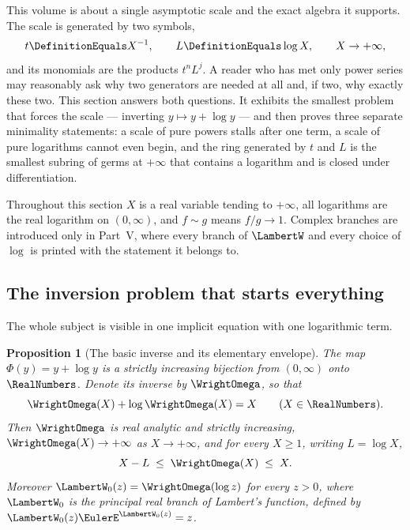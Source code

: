 \documentclass[11pt,oneside]{article}
\theoremstyle{plain}
\newtheorem{proposition}[theorem]{Proposition}
\theoremstyle{definition}
\theoremstyle{remark}
\begin{document}
This volume is about a single asymptotic scale and the exact algebra it
supports.  The scale is generated by two symbols,
\begin{equation}\label{plt:eq:mot-generators}
  t\DefinitionEquals X^{-1},
  \qquad
  L\DefinitionEquals\log X,
  \qquad X\to+\infty,
\end{equation}
and its monomials are the products \(t^{n}L^{j}\).  A reader who has met only
power series may reasonably ask why two generators are needed at all and, if
two, why exactly these two.  This section answers both questions.  It exhibits
the smallest problem that forces the scale --- inverting \(y\mapsto y+\log y\)
--- and then proves three separate minimality statements: a scale of pure
powers stalls after one term, a scale of pure logarithms cannot even begin, and
the ring generated by \(t\) and \(L\) is the smallest subring of germs at
\(+\infty\) that contains a logarithm and is closed under differentiation.

Throughout this section \(X\) is a real variable tending to \(+\infty\), all
logarithms are the real logarithm on \((0,\infty)\), and \(f\sim g\) means
\(f/g\to1\).  Complex branches are introduced only in Part~V, where every
branch of \(\LambertW\) and every choice of \(\log\) is printed with the
statement it belongs to.

\subsection{The inversion problem that starts everything}
\label{plt:sec:mot-inversion}

The whole subject is visible in one implicit equation with one logarithmic
term.

\begin{proposition}[The basic inverse and its elementary envelope]
\label{plt:prop:mot-omega-basic}
The map \(\Phi(y)=y+\log y\) is a strictly increasing bijection from
\((0,\infty)\) onto \(\RealNumbers\).  Denote its inverse by \(\WrightOmega\),
so that
\begin{equation}\label{plt:eq:mot-omega-equation}
  \WrightOmega(X)+\log\WrightOmega(X)=X
  \qquad(X\in\RealNumbers).
\end{equation}
Then \(\WrightOmega\) is real analytic and strictly increasing,
\(\WrightOmega(X)\to+\infty\) as \(X\to+\infty\), and for every \(X\ge1\),
writing \(L=\log X\),
\begin{equation}\label{plt:eq:mot-envelope}
  X-L\;\le\;\WrightOmega(X)\;\le\;X .
\end{equation}
Moreover \(\LambertW_{0}(z)=\WrightOmega(\log z)\) for every \(z>0\), where
\(\LambertW_{0}\) is the principal real branch of Lambert's function, defined
by \(\LambertW_{0}(z)\EulerE^{\LambertW_{0}(z)}=z\).
\end{proposition}
\end{document}
